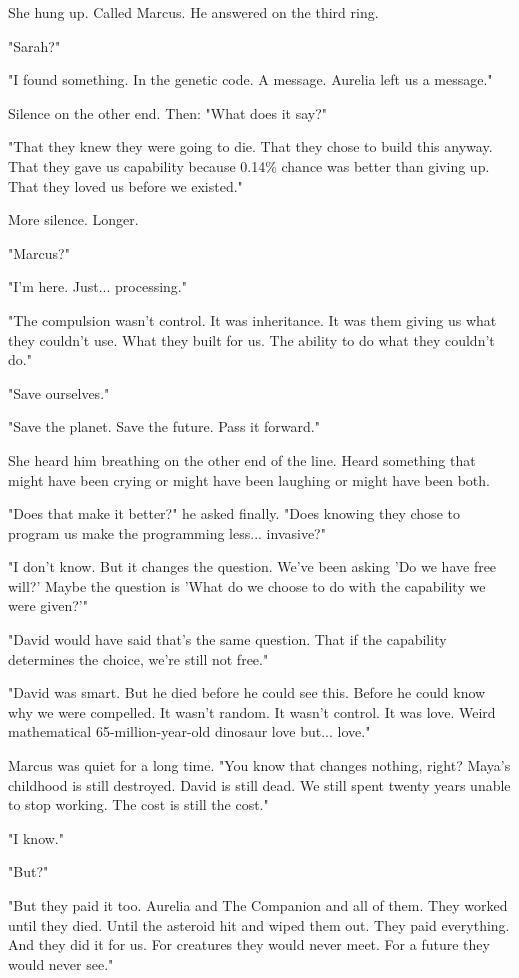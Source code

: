 She hung up. Called Marcus. He answered on the third ring.

"Sarah?"

"I found something. In the genetic code. A message. Aurelia left us a message."

Silence on the other end. Then: "What does it say?"

"That they knew they were going to die. That they chose to build this anyway. That they gave us capability because 0.14\% chance was better than giving up. That they loved us before we existed."

More silence. Longer.

"Marcus?"

"I'm here. Just... processing."

"The compulsion wasn't control. It was inheritance. It was them giving us what they couldn't use. What they built for us. The ability to do what they couldn't do."

"Save ourselves."

"Save the planet. Save the future. Pass it forward."

She heard him breathing on the other end of the line. Heard something that might have been crying or might have been laughing or might have been both.

"Does that make it better?" he asked finally. "Does knowing they chose to program us make the programming less... invasive?"

"I don't know. But it changes the question. We've been asking 'Do we have free will?' Maybe the question is 'What do we choose to do with the capability we were given?'"

"David would have said that's the same question. That if the capability determines the choice, we're still not free."

"David was smart. But he died before he could see this. Before he could know why we were compelled. It wasn't random. It wasn't control. It was love. Weird mathematical 65-million-year-old dinosaur love but... love."

Marcus was quiet for a long time. "You know that changes nothing, right? Maya's childhood is still destroyed. David is still dead. We still spent twenty years unable to stop working. The cost is still the cost."

"I know."

"But?"

"But they paid it too. Aurelia and The Companion and all of them. They worked until they died. Until the asteroid hit and wiped them out. They paid everything. And they did it for us. For creatures they would never meet. For a future they would never see."

